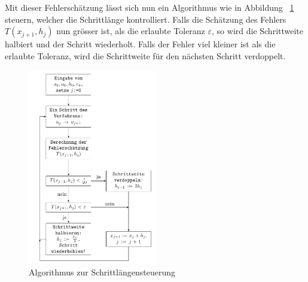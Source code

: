 Mit dieser Fehlerschätzung lässt sich nun ein Algorithmus wie in Abbildung ~\ref{buch:steps:flowchartfehlberg} steuern,
welcher die Schrittlänge kontrolliert. Falls die Schätzung des Fehlers $T(x_{j+1}, h_j)$ nun grösser ist, als die erlaubte Toleranz $\varepsilon$,
so wird die Schrittweite halbiert und der Schritt wiederholt.
Falls der Fehler viel kleiner ist als die erlaubte Toleranz, wird die Schrittweite für den nächsten Schritt verdoppelt.

\begin{figure}
  \centering
  \includegraphics[width=0.5\textwidth]{papers/steps/img/Fehlberg_Flowchart.pdf}
  \caption{Algorithmus zur Schrittlängensteuerung
    \label{buch:steps:flowchartfehlberg}}
\end{figure}
